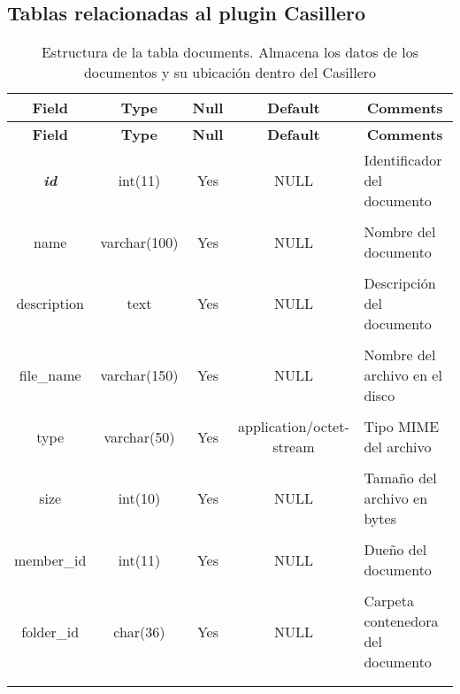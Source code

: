\subsection{Tablas relacionadas al plugin Casillero}
%
%
%
\begin{longtable}{c c c c l}
	\multicolumn{1}{c}{\textbf{Field}} &
	\multicolumn{1}{c}{\textbf{Type}} &
	\multicolumn{1}{c}{\textbf{Null}} &
	\multicolumn{1}{c}{\textbf{Default}} &
	\multicolumn{1}{c}{\textbf{Comments}} \\ \hline \hline
\endfirsthead
	\multicolumn{1}{c}{\textbf{Field}} &
	\multicolumn{1}{c}{\textbf{Type}} &
	\multicolumn{1}{c}{\textbf{Null}} &
	\multicolumn{1}{c}{\textbf{Default}} &
	\multicolumn{1}{c}{\textbf{Comments}} \\ \hline \hline
\endhead \endfoot
	\textbf{\textit{id}} & int(11) & Yes & NULL & \parbox[t]{0.35\textwidth}{Identificador del documento } \\ \\  \hline
	name & varchar(100) & Yes & NULL & \parbox[t]{0.35\textwidth}{Nombre del documento} \\ \\  \hline
	description & text & Yes & NULL & \parbox[t]{0.35\textwidth}{Descripción del documento} \\ \\  \hline
	file\_name & varchar(150) & Yes & NULL & \parbox[t]{0.35\textwidth}{Nombre del archivo en el disco} \\ \\  \hline
	type & varchar(50) & Yes & application/octet-stream & \parbox[t]{0.35\textwidth}{Tipo MIME del archivo} \\ \\  \hline
	size & int(10) & Yes & NULL & \parbox[t]{0.35\textwidth}{Tamaño del archivo en bytes} \\ \\  \hline
	member\_id & int(11) & Yes & NULL & \parbox[t]{0.35\textwidth}{Dueño del documento} \\ \\ \hline
	folder\_id & char(36) & Yes & NULL & \parbox[t]{0.35\textwidth}{Carpeta contenedora del documento} \\ \\
\caption[Estructura de la tabla documents]{Estructura de la tabla documents. Almacena los datos de los documentos y su ubicación dentro del Casillero} \label{tab:locker_documents-structure} \\
\end{longtable}

